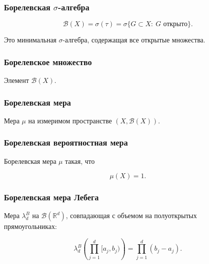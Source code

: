 \documentclass[
  11pt,
  a4paper,
]{article}
\begin{document}
\subsubsection{\texorpdfstring{Борелевская
\(\sigma\)-алгебра}{Борелевская \textbackslash sigma-алгебра}}\label{ux431ux43eux440ux435ux43bux435ux432ux441ux43aux430ux44f-sigma-ux430ux43bux433ux435ux431ux440ux430}

\[
\mathcal B(X)=\sigma(\tau)
=
\sigma\{G\subset X:\ G\text{ открыто}\}.
\]

Это минимальная \(\sigma\)-алгебра, содержащая все открытые множества.

\subsubsection{Борелевское
множество}\label{ux431ux43eux440ux435ux43bux435ux432ux441ux43aux43eux435-ux43cux43dux43eux436ux435ux441ux442ux432ux43e}

Элемент \(\mathcal B(X)\).

\subsubsection{Борелевская
мера}\label{ux431ux43eux440ux435ux43bux435ux432ux441ux43aux430ux44f-ux43cux435ux440ux430}

Мера \(\mu\) на измеримом пространстве \((X,\mathcal B(X))\).

\subsubsection{Борелевская вероятностная
мера}\label{ux431ux43eux440ux435ux43bux435ux432ux441ux43aux430ux44f-ux432ux435ux440ux43eux44fux442ux43dux43eux441ux442ux43dux430ux44f-ux43cux435ux440ux430}

Борелевская мера \(\mu\) такая, что

\[
\mu(X)=1.
\]

\subsubsection{Борелевская мера
Лебега}\label{ux431ux43eux440ux435ux43bux435ux432ux441ux43aux430ux44f-ux43cux435ux440ux430-ux43bux435ux431ux435ux433ux430}

Мера \(\lambda_d^B\) на \(\mathcal B(\mathbb R^d)\), совпадающая с
объемом на полуоткрытых прямоугольниках:

\[
\lambda_d^B\left(\prod_{j=1}^d[a_j,b_j)\right)
=
\prod_{j=1}^d(b_j-a_j).
\]
\end{document}
